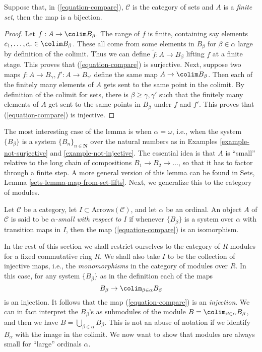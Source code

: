\begin{lemma}
\label{lemma-out-of-finite}
Suppose that, in (\ref{equation-compare}), $\mathcal{C}$ is the category
of sets and $A$ is a {\it finite set}, then the map is a bijection.
\end{lemma}

\begin{proof}
Let $f : A \to \colim B_\beta$.
The range of $f$ is finite, containing say
elements $c_1, \ldots, c_r \in \colim B_\beta$.
These all come from some elements in $B_\beta$ for $\beta \in \alpha$
large by definition of the colimit. Thus we can define
$\widetilde{f} : A \to B_\beta$ lifting $f$ at a finite stage.
This proves that (\ref{equation-compare}) is surjective.
Next, suppose two maps $f : A \to B_\gamma, f' : A \to B_{\gamma'}$
define the same map $A \to \colim B_\beta$.
Then each of the finitely many elements of $A$ gets sent to the same point in
the colimit. By definition of the colimit for sets, there is
$\beta \geq \gamma, \gamma'$ such that the finitely many elements of
$A$ get sent to the same points in $B_\beta$ under $f$ and $f'$.
This proves that (\ref{equation-compare}) is injective.
\end{proof}

\noindent
The most interesting case of the lemma is when $\alpha = \omega$, i.e.,
when the system $\{B_\beta\}$ is a system $\{B_n\}_{n \in \mathbf{N}}$
over the natural numbers as in
Examples \ref{example-not-surjective} and
\ref{example-not-injective}.
The essential idea is that $A$ is ``small'' relative to the long chain of
compositions $B_1 \to B_2 \to \ldots$, so that it has to factor through a
finite step. A more general version of this lemma can be found in
Sets, Lemma \ref{sets-lemma-map-from-set-lifts}.
Next, we generalize this to the category of modules.

\begin{definition}
\label{definition-small}
Let $\mathcal{C}$ be a category, let $I \subset \text{Arrows}(\mathcal{C})$,
and let $\alpha$ be an ordinal. An object $A$ of $\mathcal{C}$ is said to
be {\it $\alpha$-small with respect to $I$} if whenever $\{B_\beta\}$ is
a system over $\alpha$ with transition maps in $I$, then
the map (\ref{equation-compare}) is an isomorphism.
\end{definition}

\noindent
In the rest of this section we shall restrict ourselves
to the category of $R$-modules for a fixed commutative ring $R$.
We shall also take $I$ to be the collection of injective maps, i.e., the
{\it monomorphisms} in the category of modules over $R$. In this case, for
any system $\{B_\beta\}$ as in the definition each of the maps
$$
B_\beta \to \colim_{\beta \in \alpha} B_\beta
$$
is an injection. It follows that the map (\ref{equation-compare}) is an
{\it injection}. We can in fact interpret the $B_\beta$'s as submodules
of the module $B = \colim_{\beta \in \alpha} B_\beta$, and then we
have $B = \bigcup_{\beta \in \alpha} B_\beta$. This is not an abuse of
notation if we identify $B_\alpha$ with the image in the colimit.
We now want to show that modules are always small for ``large'' ordinals
$\alpha$.

